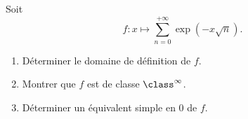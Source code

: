 \begin{enonce}
\begin{exercise}[ID={RMS135 E1459},subtitle={IMT MP 2024},tags={},difficulty={}]

Soit
\begin{equation*}
f : x \mapsto \sum_{n=0}^{+\infty} \exp(-x \sqrt{n}).
\end{equation*}

\begin{enumerate}
  \item Déterminer le domaine de définition de $f$.
  \item Montrer que $f$ est de classe $\class^{\infty}$.
  \item Déterminer un équivalent simple en $0$ de $f$.
\end{enumerate}

\end{exercise}
\begin{solution}
\end{solution}
\end{enonce}
